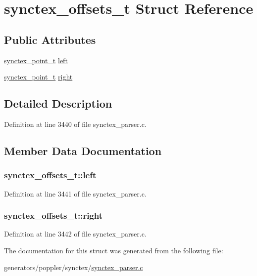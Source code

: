\hypertarget{structsynctex__offsets__t}{\section{synctex\+\_\+offsets\+\_\+t Struct Reference}
\label{structsynctex__offsets__t}
}
\subsection*{Public Attributes}
\begin{DoxyCompactItemize}
\item 
\hyperlink{structsynctex__point__t}{synctex\+\_\+point\+\_\+t} \hyperlink{structsynctex__offsets__t_a346cfb4972abd9c20f73f5f25a51dd72}{left}
\item 
\hyperlink{structsynctex__point__t}{synctex\+\_\+point\+\_\+t} \hyperlink{structsynctex__offsets__t_a2cd149f6eb10f953dd9636717dfb2852}{right}
\end{DoxyCompactItemize}


\subsection{Detailed Description}


Definition at line 3440 of file synctex\+\_\+parser.\+c.



\subsection{Member Data Documentation}
\hypertarget{structsynctex__offsets__t_a346cfb4972abd9c20f73f5f25a51dd72}{
\subsubsection[{left}]{ synctex\+\_\+offsets\+\_\+t\+::left}}\label{structsynctex__offsets__t_a346cfb4972abd9c20f73f5f25a51dd72}


Definition at line 3441 of file synctex\+\_\+parser.\+c.

\hypertarget{structsynctex__offsets__t_a2cd149f6eb10f953dd9636717dfb2852}{
\subsubsection[{right}]{ synctex\+\_\+offsets\+\_\+t\+::right}}\label{structsynctex__offsets__t_a2cd149f6eb10f953dd9636717dfb2852}


Definition at line 3442 of file synctex\+\_\+parser.\+c.



The documentation for this struct was generated from the following file\+:\begin{DoxyCompactItemize}
\item 
generators/poppler/synctex/\hyperlink{synctex__parser_8c}{synctex\+\_\+parser.\+c}\end{DoxyCompactItemize}
